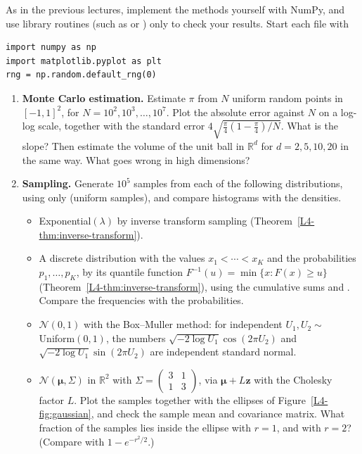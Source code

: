 \setlength{\emergencystretch}{3em}

As in the previous lectures, implement the methods yourself with NumPy, and use library routines (such as  or ) only to check your results. Start each file with
\begin{lstlisting}
import numpy as np
import matplotlib.pyplot as plt
rng = np.random.default_rng(0)
\end{lstlisting}

\begin{enumerate}[label=\textbf{P\arabic*.}, leftmargin=*]
    \item \textbf{Monte Carlo estimation.} Estimate $\pi$ from $N$ uniform random points in $[-1, 1]^2$, for $N = 10^2, 10^3, \ldots, 10^7$. Plot the absolute error against $N$ on a log-log scale, together with the standard error $4\sqrt{\frac{\pi}{4}(1 - \frac{\pi}{4})/N}$. What is the slope? Then estimate the volume of the unit ball in $\mathbb{R}^d$ for $d = 2, 5, 10, 20$ in the same way. What goes wrong in high dimensions?

    \item \homework{} \textbf{Sampling.} Generate $10^5$ samples from each of the following distributions, using only  (uniform samples), and compare histograms with the densities.
    \begin{itemize}
        \item Exponential$(\lambda)$ by inverse transform sampling (Theorem~\ref{L4-thm:inverse-transform}).
        \item A discrete distribution with the values $x_1 < \cdots < x_K$ and the probabilities $p_1, \ldots, p_K$, by its quantile function $F^{-1}(u) = \min\{x : F(x) \geq u\}$ (Theorem~\ref{L4-thm:inverse-transform}), using the cumulative sums and . Compare the frequencies with the probabilities.
        \item $\mathcal{N}(0, 1)$ with the Box--Muller method: for independent $U_1, U_2 \sim$ Uniform$(0, 1)$, the numbers $\sqrt{-2\log U_1}\cos(2\pi U_2)$ and $\sqrt{-2\log U_1}\sin(2\pi U_2)$ are independent standard normal.
        \item $\mathcal{N}(\boldsymbol{\mu}, \Sigma)$ in $\mathbb{R}^2$ with $\Sigma = \begin{pmatrix} 3 & 1 \\ 1 & 3 \end{pmatrix}$, via $\boldsymbol{\mu} + L\mathbf{z}$ with the Cholesky factor $L$. Plot the samples together with the ellipses of Figure~\ref{L4-fig:gaussian}, and check the sample mean and covariance matrix. What fraction of the samples lies inside the ellipse with $r = 1$, and with $r = 2$? (Compare with $1 - e^{-r^2/2}$.)
    \end{itemize}


\end{enumerate}
